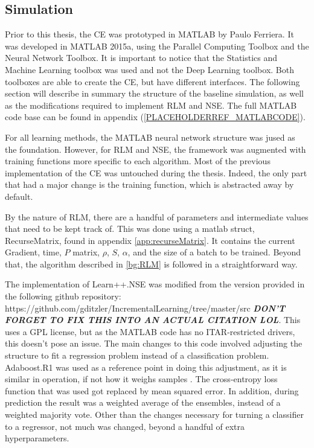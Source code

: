 \subsection{Simulation}
\par Prior to this thesis, the CE was prototyped in MATLAB by Paulo Ferriera\cite{placeholder_pauloPaper}. It was developed in MATLAB 2015a, using the Parallel Computing Toolbox and the Neural Network Toolbox. It is important to notice that the Statistics and Machine Learning toolbox was used and not the Deep Learning toolbox. Both toolboxes are able to create the CE, but have different interfaces. The following section will describe in summary the structure of the baseline simulation, as well as the modifications required to implement RLM and NSE. The full MATLAB code base can be found in appendix (\ref{PLACEHOLDERREF_MATLABCODE}).
\par For all learning methods, the MATLAB neural network structure was jused as the foundation. However, for RLM and NSE, the framework was augmented with training functions more specific to each algorithm. Most of the previous implementation of the CE was untouched during the thesis. Indeed, the only part that had a major change is the training function, which is abstracted away by default. 
\par By the nature of RLM, there are a handful of parameters and intermediate values that need to be kept track of. This was done using a matlab struct, RecurseMatrix, found in appendix \ref{app:recurseMatrix}. It contains the current Gradient, time, $P$ matrix, $\rho$, $S$, $\alpha$, and the size of a batch to be trained. Beyond that, the algorithm described in \ref{bg:RLM} is followed in a straightforward way.   
\par  The implementation of Learn++.NSE was modified from the version provided in the following github repository: https://github.com/gditzler/IncrementalLearning/tree/master/src \textbf{\textit{DON'T FORGET TO FIX THIS INTO AN ACTUAL CITATION LOL}}. This uses a GPL license, but as the MATLAB code has no ITAR-restricted drivers, this doesn't pose an issue. The main changes to this code involved adjusting the structure to fit a regression problem instead of a classification problem. Adaboost.R1 was used as a reference point in doing this adjustment, as it is similar in operation, if not how it weighs samples \cite{lol_adaboost}. The cross-entropy loss function that was used got replaced by mean squared error. In addition, during prediction the result was a weighted average of the ensembles, instead of a weighted majority vote. Other than the changes necessary for turning a classifier to a regressor, not much was changed, beyond a handful of extra hyperparameters. 

